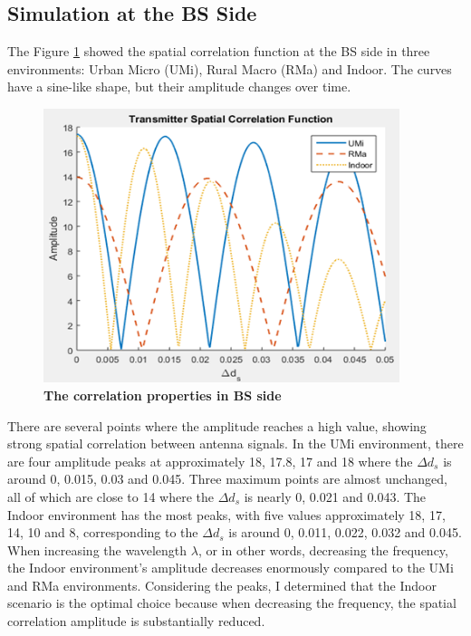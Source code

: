 \documentclass{article} %
\begin{document}
\subsection{Simulation at the BS Side}

The Figure \ref{figure2} showed the spatial correlation function at the BS side in three environments: Urban Micro (UMi), Rural Macro (RMa) and Indoor. The curves have a sine-like shape, but their amplitude changes over time.

\begin{figure}[!ht]
    \centering
    \includegraphics[height=8cm]{Images/figure2.png}
    \caption[The correlation properties in BS side~\cite{final_exam}]{\bfseries \fontsize{12pt}{0pt}\selectfont The correlation properties in BS side~\cite{final_exam}}
    \label{figure2}
\end{figure}

There are several points where the amplitude reaches a high value, showing strong spatial correlation between antenna signals. In the UMi environment, there are four amplitude peaks at approximately 18, 17.8, 17 and 18 where the $\Delta d_s$ is around 0, 0.015, 0.03 and 0.045. Three maximum points are almost unchanged, all of which are close to 14 where the $\Delta d_s$ is nearly 0, 0.021 and 0.043. The Indoor environment has the most peaks, with five values approximately 18, 17, 14, 10 and 8, corresponding to the $\Delta d_s$ is around 0, 0.011, 0.022, 0.032 and 0.045. When increasing the wavelength $\lambda$, or in other words, decreasing the frequency, the Indoor environment’s amplitude decreases enormously compared to the UMi and RMa environments. Considering the peaks, I determined that the Indoor scenario is the optimal choice because when decreasing the frequency, the spatial correlation amplitude is substantially reduced.
\end{document}
